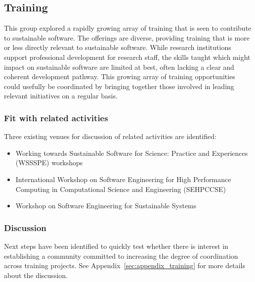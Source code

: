 \subsection{Training}


This group explored a rapidly growing array of training that is seen to
contribute to sustainable software. The offerings are diverse, providing
training that is more or less directly relevant to sustainable software. While
research institutions support professional development for research staff, the
skills taught which might impact on sustainable software are limited at best,
often lacking a clear and coherent development pathway. This growing array of
training opportunities could usefully be coordinated by bringing together those
involved in leading relevant initiatives on a regular basis.

\subsubsection{Fit with related activities} Three existing venues for discussion
of related activities are identified:

\begin{itemize}

\item Working towards Sustainable Software for Science: Practice and
Experiences (WSSSPE) workshops~\cite{WSSSPE}

\item International Workshop on Software Engineering for High
Performance Computing in Computational Science and
Engineering (SEHPCCSE)~\cite{SEHPCCSE}

\item Workshop on Software Engineering for Sustainable Systems~\cite{se4susy}

\end{itemize}

\subsubsection{Discussion}

Next steps have been identified to quickly test whether there is interest in
establishing a community committed to increasing the degree of coordination
across training projects. See Appendix~\ref{sec:appendix_training} for more details about the discussion.

